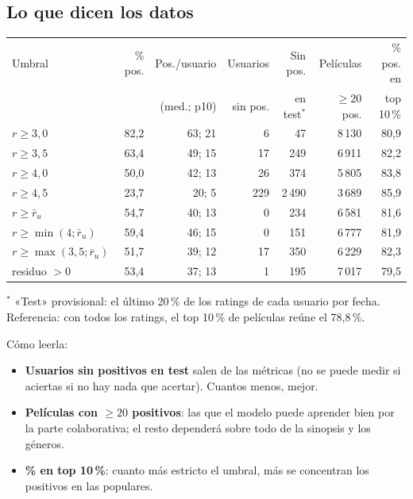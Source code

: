 \documentclass[a4paper,11pt]{article}
\begin{document}
\subsection{Lo que dicen los datos}
\begin{center}
\small
\begin{tabular}{lrrrrrr}
\toprule
Umbral & \% pos. & Pos./usuario & Usuarios & Sin pos. & Películas & \% pos. en \\
 & & (med.; p10) & sin pos. & en test$^*$ & $\ge20$ pos. & top 10\,\% \\
\midrule
$r\ge3{,}0$ & 82,2 & 63; 21 & 6 & 47 & 8\,130 & 80,9 \\
$r\ge3{,}5$ & 63,4 & 49; 15 & 17 & 249 & 6\,911 & 82,2 \\
$r\ge4{,}0$ & 50,0 & 42; 13 & 26 & 374 & 5\,805 & 83,8 \\
$r\ge4{,}5$ & 23,7 & 20; 5 & 229 & 2\,490 & 3\,689 & 85,9 \\
$r\ge\bar r_u$ & 54,7 & 40; 13 & 0 & 234 & 6\,581 & 81,6 \\
$r\ge\min(4;\bar r_u)$ & 59,4 & 46; 15 & 0 & 151 & 6\,777 & 81,9 \\
$r\ge\max(3{,}5;\bar r_u)$ & 51,7 & 39; 12 & 17 & 350 & 6\,229 & 82,3 \\
residuo $>0$ & 53,4 & 37; 13 & 1 & 195 & 7\,017 & 79,5 \\
\bottomrule
\end{tabular}
\end{center}
{\footnotesize $^*$ «Test» provisional: el último 20\,\% de los ratings de cada usuario por fecha. Referencia: con todos los
ratings, el top 10\,\% de películas reúne el 78,8\,\%.}

Cómo leerla:
\begin{itemize}
  \item \textbf{Usuarios sin positivos en test} salen de las métricas (no se puede medir si aciertas si no hay nada
        que acertar). Cuantos menos, mejor.
  \item \textbf{Películas con $\ge 20$ positivos}: las que el modelo puede aprender bien por la parte colaborativa; el
        resto dependerá sobre todo de la sinopsis y los géneros.
  \item \textbf{\% en top 10\,\%}: cuanto más estricto el umbral, más se concentran los positivos en las populares.
\end{itemize}
\end{document}
